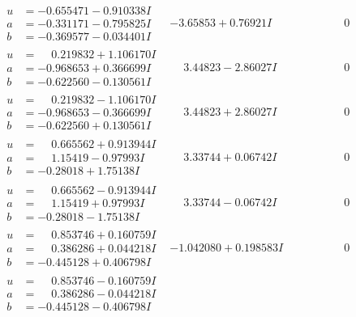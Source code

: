 \documentclass[1p]{elsarticle_modified}
\theoremstyle{definition}
\begin{document}
$$\begin{array}{c|c|c}
\begin{aligned}
u &= -0.655471 - 0.910338 I \\
a &= -0.331171 - 0.795825 I \\
b &= -0.369577 - 0.034401 I\end{aligned}
 & -3.65853 + 0.76921 I & \phantom{-0.000000 } 0 \\ \hline\begin{aligned}
u &= \phantom{-}0.219832 + 1.106170 I \\
a &= -0.968653 + 0.366699 I \\
b &= -0.622560 - 0.130561 I\end{aligned}
 & \phantom{-}3.44823 - 2.86027 I & \phantom{-0.000000 } 0 \\ \hline\begin{aligned}
u &= \phantom{-}0.219832 - 1.106170 I \\
a &= -0.968653 - 0.366699 I \\
b &= -0.622560 + 0.130561 I\end{aligned}
 & \phantom{-}3.44823 + 2.86027 I & \phantom{-0.000000 } 0 \\ \hline\begin{aligned}
u &= \phantom{-}0.665562 + 0.913944 I \\
a &= \phantom{-}1.15419 - 0.97993 I \\
b &= -0.28018 + 1.75138 I\end{aligned}
 & \phantom{-}3.33744 + 0.06742 I & \phantom{-0.000000 } 0 \\ \hline\begin{aligned}
u &= \phantom{-}0.665562 - 0.913944 I \\
a &= \phantom{-}1.15419 + 0.97993 I \\
b &= -0.28018 - 1.75138 I\end{aligned}
 & \phantom{-}3.33744 - 0.06742 I & \phantom{-0.000000 } 0 \\ \hline\begin{aligned}
u &= \phantom{-}0.853746 + 0.160759 I \\
a &= \phantom{-}0.386286 + 0.044218 I \\
b &= -0.445128 + 0.406798 I\end{aligned}
 & -1.042080 + 0.198583 I & \phantom{-0.000000 } 0 \\ \hline\begin{aligned}
u &= \phantom{-}0.853746 - 0.160759 I \\
a &= \phantom{-}0.386286 - 0.044218 I \\
b &= -0.445128 - 0.406798 I\end{aligned}

\end{array}$$
\end{document}
